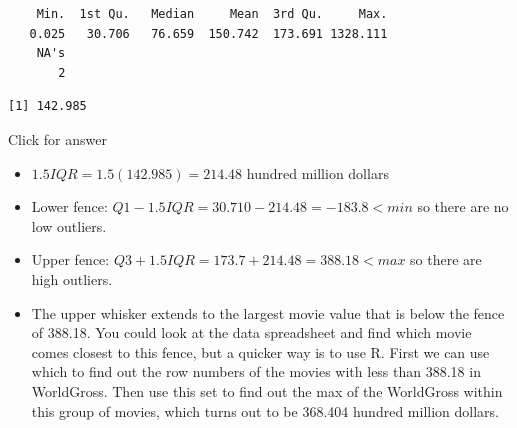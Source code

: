 \documentclass[
]{book}
\newenvironment{Shaded}{\begin{snugshade}}{\end{snugshade}}
\newcommand{\AttributeTok}[1]{\textcolor[rgb]{0.77,0.63,0.00}{#1}}
\newcommand{\ConstantTok}[1]{\textcolor[rgb]{0.00,0.00,0.00}{#1}}
\newcommand{\DecValTok}[1]{\textcolor[rgb]{0.00,0.00,0.81}{#1}}
\newcommand{\FloatTok}[1]{\textcolor[rgb]{0.00,0.00,0.81}{#1}}
\newcommand{\FunctionTok}[1]{\textcolor[rgb]{0.00,0.00,0.00}{#1}}
\newcommand{\NormalTok}[1]{#1}
\newcommand{\SpecialCharTok}[1]{\textcolor[rgb]{0.00,0.00,0.00}{#1}}
\begin{document}
\begin{Shaded}
\end{Shaded}

\begin{verbatim}
    Min.  1st Qu.   Median     Mean  3rd Qu.     Max. 
   0.025   30.706   76.659  150.742  173.691 1328.111 
    NA's 
       2 
\end{verbatim}

\begin{Shaded}
\end{Shaded}

\begin{verbatim}
[1] 142.985
\end{verbatim}

Click for answer

\begin{itemize}
\item
  \(1.5IQR = 1.5(142.985) = 214.48\) hundred million dollars
\item
  Lower fence: \(Q1 - 1.5IQR = 30.710 - 214.48 = -183.8 < min\) so there are no low outliers.
\item
  Upper fence: \(Q3 + 1.5IQR = 173.7 + 214.48 = 388.18 < max\) so there are high outliers.
\item
  The upper whisker extends to the largest movie value that is below the fence of 388.18. You could look at the data spreadsheet and find which movie comes closest to this fence, but a quicker way is to use R. First we can use which to find out the row numbers of the movies with less than 388.18 in WorldGross. Then use this set to find out the max of the WorldGross within this group of movies, which turns out to be 368.404 hundred million dollars.
\end{itemize}

\begin{Shaded}
\end{Shaded}
\end{document}
